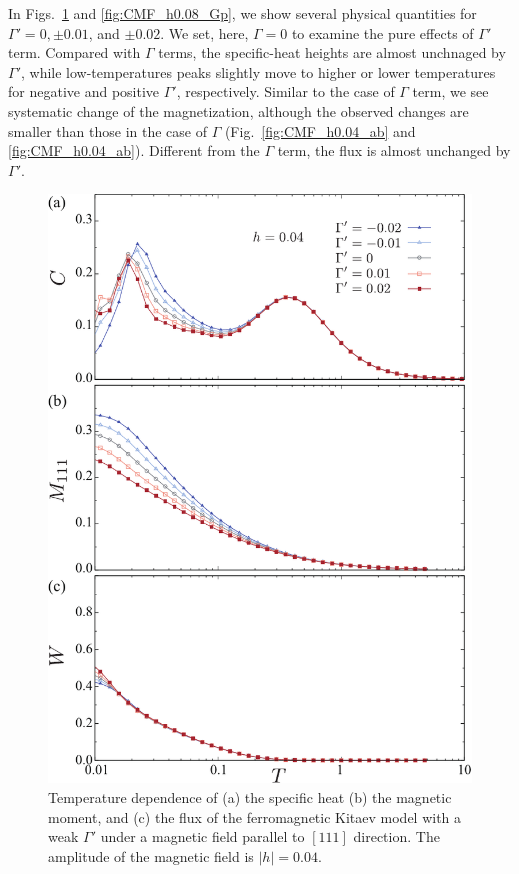 \documentclass[reprint,amsmath,amssymb,aps,prx]{revtex4-2}
\begin{document}
   In Figs.~\ref{fig:CMF_h0.04_Gp} and \ref{fig:CMF_h0.08_Gp}, we show several physical quantities for $\Gamma' = 0, \pm 0.01$, and $\pm 0.02$. We set, here, $\Gamma = 0$ to examine the pure effects of $\Gamma'$ term. Compared with $\Gamma$ terms, the specific-heat heights are almost unchnaged by $\Gamma'$, while low-temperatures peaks slightly move to higher or lower temperatures for negative and positive $\Gamma'$, respectively. Similar to the case of $\Gamma$ term, we see systematic change of the magnetization, although the observed changes are smaller than those in the case of $\Gamma$ (Fig.~\ref{fig:CMF_h0.04_ab} and \ref{fig:CMF_h0.04_ab}). Different from the $\Gamma$ term, the flux is almost unchanged by $\Gamma'$. 
\begin{figure}
  \begin{center}
    \includegraphics[width=0.9\linewidth]{Figs/plot_CMF_h0.04_Gp.pdf}
  \end{center}
  \caption{Temperature dependence of (a) the specific heat (b) the magnetic moment, and (c) the flux of the ferromagnetic Kitaev model with a weak $\Gamma'$ under a magnetic field parallel to $[111]$ direction. The amplitude of the magnetic field is $|h|=0.04$.}
  \label{fig:CMF_h0.04_Gp}
\end{figure}
\end{document}

